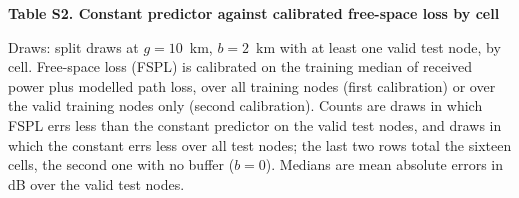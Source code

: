 \documentclass[10pt,a4paper]{article}
\newcommand{\tabajusta}[1]{\sbox{\tabcaixa}{#1}\ifdim\wd\tabcaixa>\linewidth\resizebox{\linewidth}{!}{\usebox{\tabcaixa}}\else\usebox{\tabcaixa}\fi}
\begin{document}
{\large\bfseries Table S2. Constant predictor against calibrated free-space loss by cell}

\medskip
\small
Draws: split draws at $g = 10$~km, $b = 2$~km with at least one valid test node, by cell. Free-space loss (FSPL) is calibrated on the training median of received power plus modelled path loss, over all training nodes (first calibration) or over the valid training nodes only (second calibration). Counts are draws in which FSPL errs less than the constant predictor on the valid test nodes, and draws in which the constant errs less over all test nodes; the last two rows total the sixteen cells, the second one with no buffer ($b = 0$). Medians are mean absolute errors in dB over the valid test nodes.

\medskip
\centering
\tabajusta{}
\end{document}
